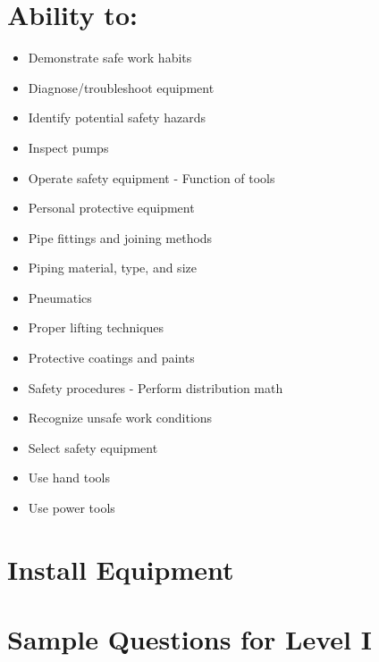 \documentclass[10pt]{article}
\begin{document}
\section{Ability to:}
\begin{itemize}
  \item Demonstrate safe work habits

  \item Diagnose/troubleshoot equipment

  \item Identify potential safety hazards

  \item Inspect pumps

  \item Operate safety equipment - Function of tools

  \item Personal protective equipment

  \item Pipe fittings and joining methods

  \item Piping material, type, and size

  \item Pneumatics

  \item Proper lifting techniques

  \item Protective coatings and paints

  \item Safety procedures - Perform distribution math

  \item Recognize unsafe work conditions

  \item Select safety equipment

  \item Use hand tools

  \item Use power tools

\end{itemize}

\section{Install Equipment}
\section{Sample Questions for Level I}
\end{document}
